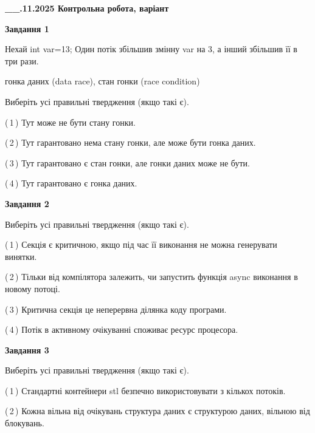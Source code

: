 \documentclass[12pt, ukrainian]{article}
\begin{document}
\begin {large}

\textbf{\_\_.11.2025 Контрольна робота, варіант  }\par


{

\begin{center}
\textbf{Завдання 1}
\end{center}
Нехай int var=13; Один потік збільшив змінну var на 3, а інший збільшив її в три рази.

гонка даних (data race), стан гонки (race condition)

Виберіть усі правильні твердження (якщо такі є).\par
\vspace{2mm}
(\,1\,) Тут може не бути стану гонки.%

(\,2\,) Тут гарантовано нема стану гонки, але може бути гонка даних.%

(\,3\,) Тут гарантовано є стан гонки, але гонки даних може не бути.%

(\,4\,) Тут гарантовано є гонка даних.%



\begin{center}
\textbf{Завдання 2}
\end{center}
Виберіть усі правильні твердження (якщо такі є).\par
\vspace{2mm}

(\,1\,) Секція є критичною, якщо під час її виконання не можна генерувати винятки.%

(\,2\,) Тільки від компілятора залежить, чи запустить функція async виконання в новому потоці.%

(\,3\,) Критична секція це неперервна ділянка коду програми.%

(\,4\,) Потік в активному очікуванні споживає ресурс процесора.%



\begin{center}
\textbf{Завдання 3}
\end{center}
Виберіть усі правильні твердження (якщо такі є).\par
\vspace{2mm}

(\,1\,) Стандартні контейнери stl безпечно використовувати з кількох потоків.%

(\,2\,) Кожна вільна від очікувань структура даних є структурою даних, вільною від блокувань.%

}
\end{large}
\end{document}
